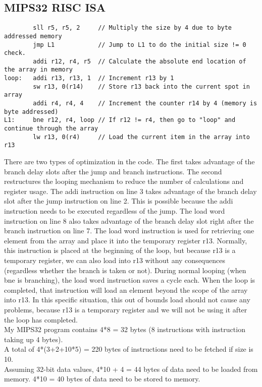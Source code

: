 \documentclass[10pt]{article}
\begin{document}
\subsection{MIPS32 RISC ISA}
\begin{lstlisting}
        sll r5, r5, 2     // Multiply the size by 4 due to byte addressed memory
        jmp L1            // Jump to L1 to do the initial size != 0 check.
        addi r12, r4, r5  // Calculate the absolute end location of the array in memory
loop:   addi r13, r13, 1  // Increment r13 by 1
        sw r13, 0(r14)    // Store r13 back into the current spot in array
        addi r4, r4, 4    // Increment the counter r14 by 4 (memory is byte addressed)
L1:     bne r12, r4, loop // If r12 != r4, then go to "loop" and continue through the array
        lw r13, 0(r4)     // Load the current item in the array into r13
\end{lstlisting}
There are two types of optimization in the code. The first takes advantage of the branch delay slots after the jump and branch instructions. The second restructures the looping mechanism to reduce the number of calculations and register usage. The addi instruction on line 3 takes advantage of the branch delay slot after the jump instruction on line 2. This is possible because the addi instruction needs to be executed regardless of the jump. The load word instruction on line 8 also takes advantage of the branch delay slot right after the branch instruction on line 7. The load word instruction is used for retrieving one element from the array and place it into the temporary register r13. Normally, this instruction is placed at the beginning of the loop, but because r13 is a temporary register, we can also load into r13 without any consequences (regardless whether the branch is taken or not). During normal looping (when bne is branching), the load word instruction saves a cycle each. When the loop is completed, that instruction will load an element beyond the scope of the array into r13. In this specific situation, this out of bounds load should not cause any problems, because r13 is a temporary register and we will not be using it after the loop has completed. \\
My MIPS32 program contains 4*8 = 32 bytes (8 instructions with instruction taking up 4 bytes).\\
A total of 4*(3+2+10*5) = 220 bytes of instructions need to be fetched if size is 10. \\
Assuming 32-bit data values, 4*10 + 4 = 44 bytes of data need to be loaded from memory. 4*10 = 40 bytes of data need to be stored to memory.
\end{document}
